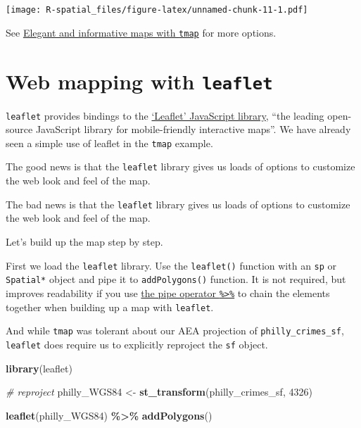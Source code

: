 \documentclass[
]{book}
\newenvironment{Shaded}{\begin{snugshade}}{\end{snugshade}}
\newcommand{\CommentTok}[1]{\textcolor[rgb]{0.56,0.35,0.01}{\textit{#1}}}
\newcommand{\DecValTok}[1]{\textcolor[rgb]{0.00,0.00,0.81}{#1}}
\newcommand{\FunctionTok}[1]{\textcolor[rgb]{0.13,0.29,0.53}{\textbf{#1}}}
\newcommand{\NormalTok}[1]{#1}
\newcommand{\OtherTok}[1]{\textcolor[rgb]{0.56,0.35,0.01}{#1}}
\newcommand{\SpecialCharTok}[1]{\textcolor[rgb]{0.81,0.36,0.00}{\textbf{#1}}}
\begin{document}
\texttt{[image: R-spatial\_files/figure-latex/unnamed-chunk-11-1.pdf]}

See \href{https://r-tmap.github.io/tmap-book/}{Elegant and informative maps with \texttt{tmap}} for more options.

\hypertarget{web-mapping-with-leaflet}{%
\section{\texorpdfstring{Web mapping with \texttt{leaflet}}{Web mapping with leaflet}}\label{web-mapping-with-leaflet}}

\texttt{leaflet} provides bindings to the \href{http://leafletjs.com}{`Leaflet' JavaScript library}, ``the leading open-source JavaScript library for mobile-friendly interactive maps''. We have already seen a simple use of leaflet in the \texttt{tmap} example.

The good news is that the \texttt{leaflet} library gives us loads of options to customize the web look and feel of the map.

The bad news is that the \texttt{leaflet} library gives us loads of options to customize the web look and feel of the map.

Let's build up the map step by step.

First we load the \texttt{leaflet} library. Use the \texttt{leaflet()} function with an \texttt{sp} or \texttt{Spatial*} object and pipe it to \texttt{addPolygons()} function. It is not required, but improves readability if you use \href{https://github.com/tidyverse/magrittr}{the pipe operator \texttt{\%\textgreater{}\%}} to chain the elements together when building up a map with \texttt{leaflet}.

And while \texttt{tmap} was tolerant about our AEA projection of \texttt{philly\_crimes\_sf}, \texttt{leaflet} does require us to explicitly reproject the \texttt{sf} object.

\begin{Shaded}
\begin{Highlighting}[]
\FunctionTok{library}\NormalTok{(leaflet) }

\CommentTok{\# reproject}
\NormalTok{philly\_WGS84 }\OtherTok{\textless{}{-}} \FunctionTok{st\_transform}\NormalTok{(philly\_crimes\_sf, }\DecValTok{4326}\NormalTok{)}

\FunctionTok{leaflet}\NormalTok{(philly\_WGS84) }\SpecialCharTok{\%\textgreater{}\%}
  \FunctionTok{addPolygons}\NormalTok{()}
\end{Highlighting}
\end{Shaded}
\end{document}
